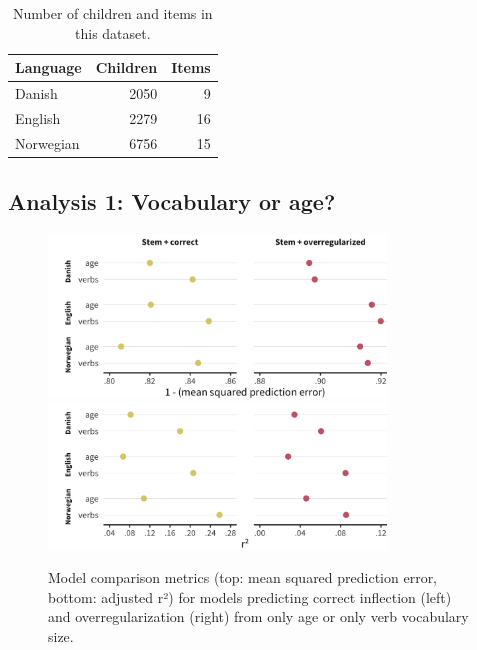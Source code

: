 \documentclass[
   11pt,
       ]{book}
\begin{document}
\begin{table}

\caption{\label{tab:samples}Number of children and items in this dataset.}
\centering
\begin{tabular}[t]{lrr}
\toprule
Language & Children & Items\\
\midrule
Danish & 2050 & 9\\
English & 2279 & 16\\
Norwegian & 6756 & 15\\
\bottomrule
\end{tabular}
\end{table}

\hypertarget{analysis-1-vocabulary-or-age}{%
\subsection{Analysis 1: Vocabulary or age?}\label{analysis-1-vocabulary-or-age}}

\begin{figure}

{\centering \includegraphics[width=0.8\textwidth]{03-cdi-overreg/plots/models-mse} \includegraphics[width=0.8\textwidth]{03-cdi-overreg/plots/models-rsq} 

}

\caption{Model comparison metrics (top: mean squared prediction error, bottom: adjusted r²) for models predicting correct inflection (left) and overregularization (right) from only age or only verb vocabulary size.}\label{fig:overreg-modelcomp}
\end{figure}
\end{document}
